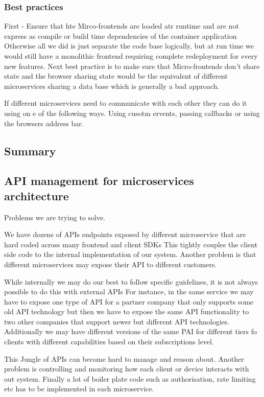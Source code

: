\documentclass[a4paper, 11pt]{book}
\begin{document}
    \subsubsection{Best practices}
    First - Ensure that hte Mirco-frontends are loaded atr runtime and are not express as compile or build time dependencies of the container application
    Otherwise all we did is just separate the code base logically, but at run time we would still have a monolithic frontend requiring complete redeployment for every new features.
    Next best practice is to make sure that Micro-frontends don't share state and the browser sharing state would be the equivalent of different microservices sharing a data base which is generally a bad approach.

    If different microservices need to communicate with each other they can do it using on e of the following ways. Using cusotm ervents, passing callbacks or using the browsers address bar.

    \subsection{Summary}

    \subsection{API management for microservices architecture}
    Problems we are trying to solve.

    We have dozens of APIs endpoints exposed by different microservice that are hard coded across many frontend and client SDKs
    This tightly couples the client side code to the internal implementation of our system.
    Another problem is that different microservices may expose their API to different customers.

    While internally we may do our best to follow specific guidelines, it is not always possible to do this with external APIs
    For instance, in the same service we may have to expose one type of API for a partner company that only supports some old API technology but then we have to expose the same API functionality to two other companies that support newer but different API technologies.
    Additionally we may have different versions of the same PAI for different tiers fo clients with different capabilities based on their subscriptions level.

    This Jungle of APIs can become hard to manage and reason about.
    Another problem is controlling and monitoring how each client or device interacts with out system.
    Finally a lot of boiler plate code such as authorisation, rate limiting etc has to be implemented in each microservice.
\end{document}
